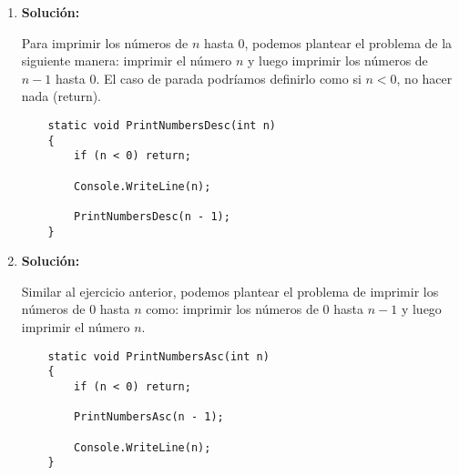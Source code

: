 \begin{enumerate}[label=\alph*)]
    \item \textbf{Solución:}
    
    Para imprimir los números de $n$ hasta 0, podemos plantear el problema de la siguiente manera:  imprimir el número $n$ y luego imprimir los números de $n-1$ hasta 0. El caso de parada podríamos definirlo como si $n < 0$, no hacer nada (return).
    \begin{lstlisting}
    static void PrintNumbersDesc(int n)
    {
        if (n < 0) return;
        
        Console.WriteLine(n);
        
        PrintNumbersDesc(n - 1);
    }
    \end{lstlisting}
    \item \textbf{Solución:}
    
    Similar al ejercicio anterior, podemos plantear el problema de imprimir los números de 0 hasta $n$ como: imprimir los números de 0 hasta $n-1$ y luego imprimir el número $n$. 
    \begin{lstlisting}
    static void PrintNumbersAsc(int n)
    {
        if (n < 0) return;
            
        PrintNumbersAsc(n - 1);
            
        Console.WriteLine(n);
    }
    \end{lstlisting}
\end{enumerate}
